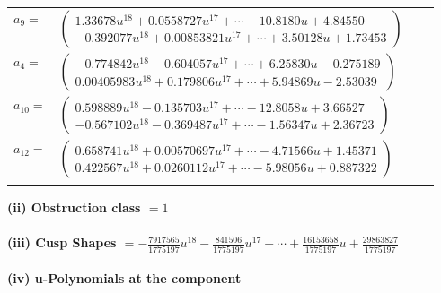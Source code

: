 \documentclass[1p]{elsarticle_modified}
\theoremstyle{definition}
\begin{document}
\begin{tabular}{m{7pt} m{180pt} m{7pt} m{180pt} }
\flushright $a_{9}=$&$\begin{pmatrix}1.33678 u^{18}+0.0558727 u^{17}+\cdots-10.8180 u+4.84550\\-0.392077 u^{18}+0.00853821 u^{17}+\cdots+3.50128 u+1.73453\end{pmatrix}$ \\
\flushright $a_{4}=$&$\begin{pmatrix}-0.774842 u^{18}-0.604057 u^{17}+\cdots+6.25830 u-0.275189\\0.00405983 u^{18}+0.179806 u^{17}+\cdots+5.94869 u-2.53039\end{pmatrix}$ \\
\flushright $a_{10}=$&$\begin{pmatrix}0.598889 u^{18}-0.135703 u^{17}+\cdots-12.8058 u+3.66527\\-0.567102 u^{18}-0.369487 u^{17}+\cdots-1.56347 u+2.36723\end{pmatrix}$ \\
\flushright $a_{12}=$&$\begin{pmatrix}0.658741 u^{18}+0.00570697 u^{17}+\cdots-4.71566 u+1.45371\\0.422567 u^{18}+0.0260112 u^{17}+\cdots-5.98056 u+0.887322\end{pmatrix}$\\&\end{tabular}
\flushleft \textbf{(ii) Obstruction class $= 1$}\\~\\
\flushleft \textbf{(iii) Cusp Shapes $= -\frac{7917565}{1775197} u^{18}-\frac{841506}{1775197} u^{17}+\cdots+\frac{16153658}{1775197} u+\frac{29863827}{1775197}$}\\~\\
\newpage\renewcommand{\arraystretch}{1}
\flushleft \textbf{(iv) u-Polynomials at the component}\newline \\
\end{document}

